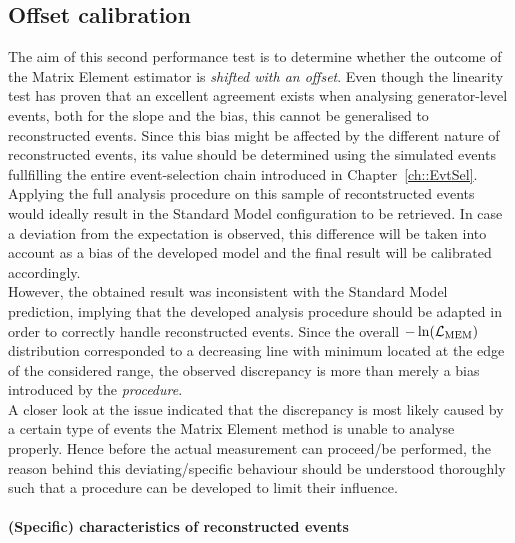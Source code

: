 \subsection{Offset calibration}

The aim of this second performance test is to determine whether the outcome of the Matrix Element estimator is \textit{shifted with an offset}.
Even though the linearity test has proven that an excellent agreement exists when analysing generator-level events, both for the slope and the bias, this cannot be generalised to reconstructed events.
Since this bias might be affected by the different nature of reconstructed events, its value should be determined using the simulated events fullfilling the entire event-selection chain introduced in Chapter~\ref{ch::EvtSel}.
\\
Applying the full analysis procedure on this sample of recontstructed events would ideally result in the Standard Model configuration to be retrieved.
In case a deviation from the expectation is observed, this difference will be taken into account as a bias of the developed model and the final result will be calibrated accordingly. 
\\

However, the obtained result was inconsistent with the Standard Model prediction, implying that the developed analysis procedure should be adapted in order to correctly handle reconstructed events.
Since the overall $-\ln(\mathcal{L}_{\textrm{MEM}})$ distribution corresponded to a decreasing line with minimum located at the edge of the considered range, the observed discrepancy is more than merely a bias introduced by the \textit{procedure}.
\\
A closer look at the issue indicated that the discrepancy is most likely caused by a certain type of events the Matrix Element method is unable to analyse properly.
Hence before the actual measurement can proceed/be performed, the reason behind this deviating/specific behaviour should be understood thoroughly such that a procedure can be developed to limit their influence.

\paragraph{(Specific) characteristics of reconstructed events} \hfill \\ %

